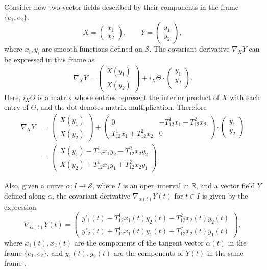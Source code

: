 \documentclass{article}
\theoremstyle{remark}
\theoremstyle{definition}
\begin{document}
Consider now two vector fields described by their components in the frame $\{e_1,e_2\}$:
$$
X=
\begin{pmatrix}
    x_1\\
    x_2
\end{pmatrix}, \qquad
Y=
\begin{pmatrix}
    y_1\\
    y_2
\end{pmatrix},
$$
where $x_i,y_i$ are smooth functions defined on $\mathcal{S}$. The covariant derivative $\nabla_{X} Y$ can be expressed in this frame as
$$
\nabla_{X} Y=
\begin{pmatrix}
X(y_1)\\
X(y_2)
\end{pmatrix} +i_X \Theta \cdot \begin{pmatrix}
y_1\\
y_2\\
\end{pmatrix}.
$$
Here, \(i_X \Theta\) is a matrix whose entries represent the interior product of \(X\) with each entry of \(\Theta\), and the dot denotes matrix multiplication. Therefore
\begin{align}
    \nabla_{X} Y &= \begin{pmatrix}
    X(y_1) \\
    X(y_2)
    \end{pmatrix} + 
    \begin{pmatrix}
    0 & -T_{12}^1 x_1 - T_{12}^2 x_2 \\ 
    T_{12}^1 x_1 + T_{12}^2 x_2 & 0
    \end{pmatrix}
    \cdot
    \begin{pmatrix}
    y_1 \\
    y_2
    \end{pmatrix} \nonumber \\
    &= \begin{pmatrix}
    X(y_1) - T_{12}^1 x_1 y_2 - T_{12}^2 x_2 y_2 \\
    X(y_2) + T_{12}^1 x_1 y_1 + T_{12}^2 x_2 y_1
    \end{pmatrix}. \label{covDeriv}
\end{align}

Also, given a curve $\alpha: I\to \mathcal{S}$, where $I$ is an open interval in $\mathbb R$, and a vector field $Y$ defined along $\alpha$, the covariant derivative $\nabla_{\dot{\alpha}(t)} Y(t)$ for $t\in I$ is given by the expression
\begin{equation}\label{eq:covDerivCurve}
    \nabla_{\dot{\alpha}(t)} Y(t)= \begin{pmatrix}
        y'_1(t) - T_{12}^1 x_1(t) y_2(t) - T_{12}^2 x_2(t) y_2(t) \\
        y'_2(t) + T_{12}^1 x_1(t) y_1(t) + T_{12}^2 x_2(t) y_1(t)
        \end{pmatrix},    
\end{equation}
where $x_1(t),x_2(t)$ are the components of the tangent vector $\dot{\alpha}(t)$ in the frame $\{e_1,e_2\}$, and $y_1(t),y_2(t)$ are the components of $Y(t)$ in the same frame \cite{lee2006curvature}. 
\end{document}
